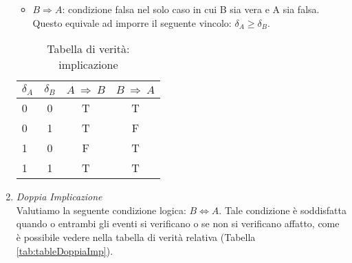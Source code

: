 \begin{enumerate}
\begin{itemize}
\item $B \Longrightarrow A$: condizione falsa nel solo caso in cui B sia vera e A sia falsa.
Questo equivale ad imporre il seguente vincolo: $\delta_A \geq \delta_B$.
\end{itemize}

\begin{table}[h!]
  \begin{center}
    \begin{tabular}{l|c|c|c} %
      $\delta_A$ & $\delta_B$ & $A~\Longrightarrow~B$ & $B~\Longrightarrow~A$ \\
      \hline
      0 & 0 & T & T\\
      0 & 1 & T & F\\
      1 & 0 & F & T\\
      1 & 1 & T & T\\
    \end{tabular}
    \caption{Tabella di verità: implicazione}
    \label{tab:tableImp1}
  \end{center}
\end{table}


\item \textit{Doppia Implicazione}\\
Valutiamo la seguente condizione logica: $B \Longleftrightarrow A$.
Tale condizione è soddisfatta quando o entrambi gli eventi si verificano o se non si verificano affatto, come è possibile vedere nella tabella di verità relativa (Tabella \ref{tab:tableDoppiaImp}).


\end{enumerate}
